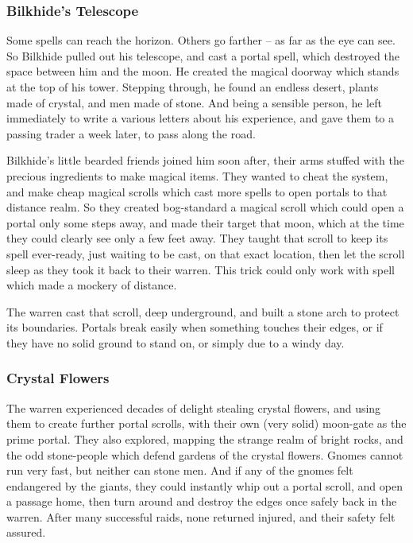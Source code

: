 \begin{multicols}{2}
\subsubsection{Bilkhide's Telescope}

Some spells can reach the horizon.
Others go farther -- as far as the eye can see.
So Bilkhide pulled out his telescope, and cast a portal spell, which destroyed the space between him and the moon.
He created the magical doorway which stands at the top of his tower.
Stepping through, he found an endless desert, plants made of crystal, and men made of stone.
And being a sensible person, he left immediately to write a various letters about his experience, and gave them to a passing trader a week later, to pass along the road.

Bilkhide's little bearded friends joined him soon after, their arms stuffed with the precious ingredients to make magical items.
They wanted to cheat the system, and make cheap magical scrolls which cast more spells to open portals to that distance realm.
So they created bog-standard a magical scroll which could open a portal only some steps away, and made their target that moon, which at the time they could clearly see only a few feet away.
They taught that scroll to keep its spell ever-ready, just waiting to be cast, on that exact location, then let the scroll sleep as they took it back to their warren.
This trick could only work with spell which made a mockery of distance.

The warren cast that scroll, deep underground, and built a stone arch to protect its boundaries.
Portals break easily when something touches their edges, or if they have no solid ground to stand on, or simply due to a windy day.

\subsubsection{Crystal Flowers}

The warren experienced decades of delight stealing crystal flowers, and using them to create further portal scrolls, with their own (very solid) moon-gate as the prime portal.
They also explored, mapping the strange realm of bright rocks, and the odd stone-people which defend gardens of the crystal flowers.
Gnomes cannot run very fast, but neither can stone men.
And if any of the gnomes felt endangered by the giants, they could instantly whip out a portal scroll, and open a passage home, then turn around and destroy the edges once safely back in the warren.
After many successful raids, none returned injured, and their safety felt assured.


\end{multicols}
